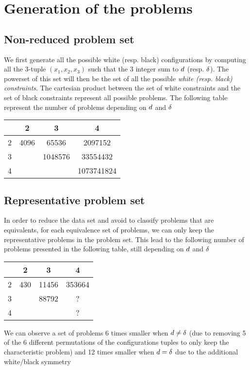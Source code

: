 \section{Generation of the problems}
\subsection{Non-reduced problem set}
We first generate all the possible white (resp. black) configurations by computing all the 3-tuple $(x_1,x_2, x_3)$ such that the 3 integer sum to $\wdd$ (resp. $\bdd$).
The powerset of this set will then be the set of all the possible \textit{white (resp. black) constraints}.
The cartesian product between the set of white constraints and the set of black constraints represent all possible problems. The following table represent the number of problems depending on $\wdd$ and $\bdd$
\begin{center}
\begin{tabular}{ | c | c | c | c |}
 \hline
 \diagbox{$\wdd$}{$\bdd$} & 2 & 3 & 4 \\ 
 \hline
 2 & 4096 & 65536 & 2097152\\
 \hline
 3 &  & 1048576 & 33554432\\
 \hline
 4 &  &  &  1073741824\\
\hline
\end{tabular}
\end{center}
\subsection{Representative problem set}
In order to reduce the data set and avoid to classify problems that are equivalents, for each equivalence set of problems, we can only keep the representative problems in the problem set. This lead to the following number of problems presented in the following table, still depending on $\wdd$ and $\bdd$
\begin{center}
\begin{tabular}{ | c | c | c | c |}
 \hline
 \diagbox{$\wdd$}{$\bdd$} & 2 & 3 & 4 \\ 
 \hline
 2 & 430 & 11456 & 353664\\
 \hline
 3 &  & 88792 & ?\\
 \hline
 4 &  &  &  ?\\
\hline
\end{tabular}
\end{center}

We can observe a set of problems 6 times smaller when $d \neq \delta$ (due to removing 5 of the 6 different permutations of the configurations tuples to only keep the characteristic problem) and 12 times smaller when $d=\delta$ due to the additional white/black symmetry

